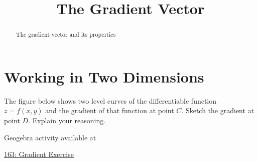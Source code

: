 \documentclass{ximera}
\title{The Gradient Vector}
\begin{document}
\begin{abstract}
The gradient vector and its properties
\end{abstract}
\maketitle

\section{Working in Two Dimensions}


\begin{question}  \label{Qdr4356}
The figure below shows two level curves of the differentiable function $z=f(x,y)$ and the gradient of that function at point $C$. Sketch the gradient at point $D$. Explain your reasoning.

 
\begin{onlineOnly}
    \begin{center}
\end{center}
\end{onlineOnly}

Geogebra activity available at

\href{https://www.geogebra.org/classic/zau4grcm}{163: Gradient Exercise}
\end{question}
\end{document}
